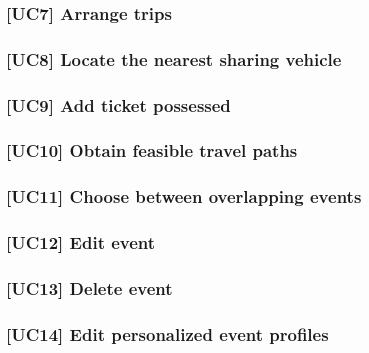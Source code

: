 	\subsubsection{[UC7] Arrange trips}
			
		
	\subsubsection{[UC8] Locate the nearest sharing vehicle}
			
		
	\subsubsection{[UC9] Add ticket possessed}
			
	
	\subsubsection{[UC10] Obtain feasible travel paths}
			
	
	\subsubsection{[UC11] Choose between overlapping events}
		
		
	\subsubsection{[UC12] Edit event}
		
		
	\subsubsection{[UC13] Delete event}
		
		
	\subsubsection{[UC14] Edit personalized event profiles}
		
		
